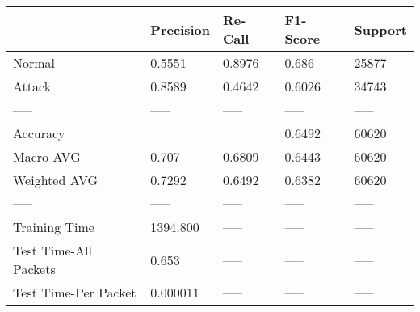 \begin{tabular}{lllll}
\toprule
{} & Precision & Re-Call & F1-Score & Support \\
\midrule
Normal                &    0.5551 &  0.8976 &    0.686 &   25877 \\
Attack                &    0.8589 &  0.4642 &   0.6026 &   34743 \\
-----                 &     ----- &   ----- &    ----- &   ----- \\
Accuracy              &           &         &   0.6492 &   60620 \\
Macro AVG             &     0.707 &  0.6809 &   0.6443 &   60620 \\
Weighted AVG          &    0.7292 &  0.6492 &   0.6382 &   60620 \\
-----                 &     ----- &   ----- &    ----- &   ----- \\
Training Time         &  1394.800 &   ----- &    ----- &   ----- \\
Test Time-All Packets &     0.653 &   ----- &    ----- &   ----- \\
Test Time-Per Packet  &  0.000011 &   ----- &    ----- &   ----- \\
\bottomrule
\end{tabular}
